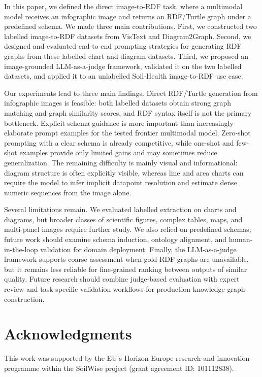 \documentclass[preprint,12pt]{elsarticle}
\begin{document}
In this paper, we defined the direct image-to-RDF task, where a multimodal model receives an infographic image and returns an
RDF/Turtle graph under a predefined schema. We made three main contributions.
First, we constructed two labelled image-to-RDF datasets from VisText and
Diagram2Graph. Second, we designed and evaluated end-to-end prompting strategies
for generating RDF graphs from these labelled chart and diagram datasets. Third,
we proposed an image-grounded LLM-as-a-judge framework, validated it on the two
labelled datasets, and applied it to an unlabelled Soil-Health image-to-RDF use
case.

Our experiments lead to three main findings. Direct RDF/Turtle generation from
infographic images is feasible: both labelled datasets obtain strong graph
matching and graph similarity scores, and RDF syntax itself is not the primary
bottleneck. Explicit schema guidance is more important than increasingly
elaborate prompt examples for the tested frontier multimodal model. Zero-shot
prompting with a clear schema is already competitive, while one-shot and
few-shot examples provide only limited gains and may sometimes reduce
generalization. The remaining difficulty is mainly visual and informational:
diagram structure is often explicitly visible, whereas line and area charts can
require the model to infer implicit datapoint resolution and estimate dense
numeric sequences from the image alone.

Several limitations remain. We evaluated labelled extraction on charts and
diagrams, but broader classes of scientific figures, complex tables, maps, and
multi-panel images require further study. We also relied on predefined schemas;
future work should examine schema induction, ontology alignment, and
human-in-the-loop validation for domain deployment. Finally, the LLM-as-a-judge
framework supports coarse assessment when gold RDF graphs are unavailable, but
it remains less reliable for fine-grained ranking between outputs of similar
quality. Future research should combine judge-based evaluation with expert
review and task-specific validation workflows for production knowledge graph
construction.

\section*{Acknowledgments}
This work was supported by the EU’s Horizon Europe research and innovation programme within the SoilWise project (grant agreement ID: 101112838).
\end{document}
